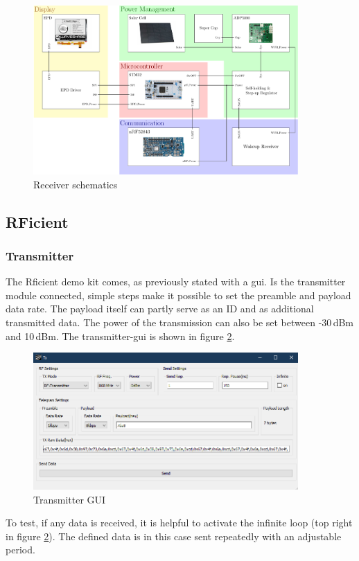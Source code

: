 \begin{figure}[ht]
	\centering
	\includegraphics[width=0.9\textwidth]{4-development/hardware/graphics/top/top_schematics.pdf}
	\caption{Receiver schematics\label{hardware:block}}
\end{figure}

\subsection{RFicient}

\subsubsection{Transmitter}
The Rficient demo kit comes, as previously stated with a \acs{gui}.
Is the transmitter module connected, simple steps make it possible to set the preamble and payload data rate. 
The payload itself can partly serve as an ID and as additional transmitted data.
The power of the transmission can also be set between -30\,dBm and 10\,dBm.
The transmitter-\acs{gui} is shown in figure \ref{development:tx}.
\begin{figure}[ht]
	\centering
	\includegraphics[width=0.9\textwidth]{4-development/hardware/graphics/TXgui.png}
	\caption{Transmitter GUI\label{development:tx}}
\end{figure}
To test, if any data is received, it is helpful to activate the infinite loop (top right in figure \ref{development:tx}).
The defined data is in this case sent repeatedly with an adjustable period.

